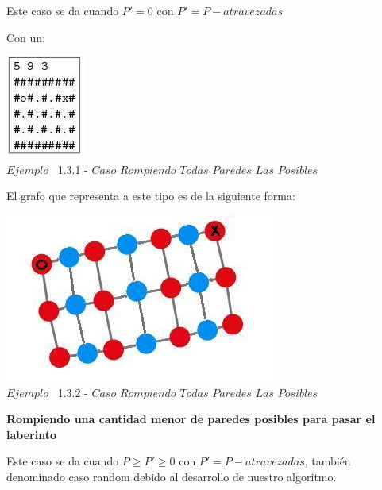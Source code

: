 Este caso se da cuando $P' = 0$ con $P' = P - atravezadas$ 

 Con un:
 
\vspace*{0.3cm} \vspace*{0.3cm}
  \begin{center}
 \includegraphics[scale=0.65]{./EJ1/ej1rompertodasparedes.jpeg}
\\ {$Ejemplo$ \ 1.3.1 - $Caso$ $Rompiendo$ $Todas$ $Paredes$ $Las$ $Posibles$}
  \end{center}
  \vspace*{0.3cm}

El grafo que representa a este tipo es de la siguiente forma:\\

\vspace*{0.3cm} \vspace*{0.3cm}
  \begin{center}
 \includegraphics[scale=0.5]{./EJ1/ej1grafosolucionconpared.jpeg}
 \\{$Ejemplo$ \ 1.3.2 - $Caso$ $Rompiendo$ $Todas$ $Paredes$ $Las$ $Posibles$}
  \end{center}
  \vspace*{0.3cm}


\begin{center}
 \textbf{Rompiendo una cantidad menor de paredes posibles para pasar el laberinto}
\end{center}

Este caso se da cuando $P \geq P' \geq 0$ con $P' = P - atravezadas$, tambi\'en denominado caso random debido al desarrollo de nuestro algoritmo.\\



